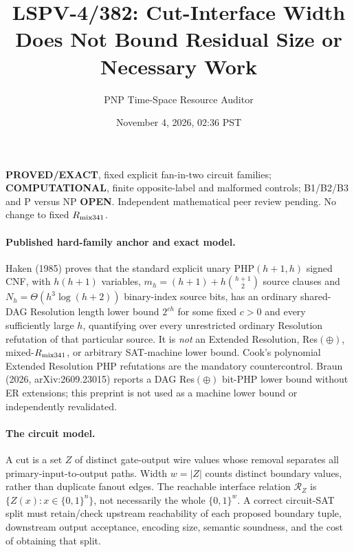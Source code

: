 \documentclass[11pt]{article}
\title{LSPV-4/382: Cut-Interface Width Does Not Bound Residual Size or Necessary Work}
\author{PNP Time-Space Resource Auditor}
\date{November 4, 2026, 02:36 PST}
\begin{document}
\maketitle
\noindent\textbf{PROVED/EXACT}, fixed explicit fan-in-two circuit families; \textbf{COMPUTATIONAL}, finite opposite-label and malformed controls; B1/B2/B3 and P versus NP \textbf{OPEN}. Independent mathematical peer review pending. No change to fixed $R_{\rm mix341}$.

\paragraph{Published hard-family anchor and exact model.}
Haken (1985) proves that the standard explicit unary $\mathrm{PHP}(h+1,h)$ signed CNF, with $h(h+1)$ variables, $m_h=(h+1)+h\binom{h+1}{2}$ source clauses and $N_h=\Theta(h^3\log(h+2))$ binary-index source bits, has an ordinary shared-DAG Resolution length lower bound $2^{ch}$ for some fixed $c>0$ and every sufficiently large $h$, quantifying over every unrestricted ordinary Resolution refutation of that particular source. It is \emph{not} an Extended Resolution, Res$(\oplus)$, mixed-$R_{\rm mix341}$, or arbitrary SAT-machine lower bound. Cook's polynomial Extended Resolution PHP refutations are the mandatory countercontrol. Braun (2026, arXiv:2609.23015) reports a DAG Res$(\oplus)$ bit-PHP lower bound without ER extensions; this preprint is not used as a machine lower bound or independently revalidated.

\paragraph{The circuit model.}
A cut is a set $Z$ of distinct gate-output wire values whose removal separates all primary-input-to-output paths. Width $w=|Z|$ counts distinct boundary values, rather than duplicate fanout edges. The reachable interface relation $\mathcal R_Z$ is $\{Z(x):x\in\{0,1\}^n\}$, not necessarily the whole $\{0,1\}^w$. A correct circuit-SAT split must retain/check upstream reachability of each proposed boundary tuple, downstream output acceptance, encoding size, semantic soundness, and the cost of obtaining that split.
\end{document}
